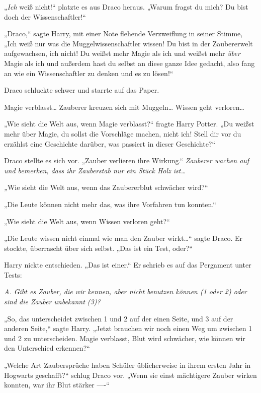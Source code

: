 {„\emph{Ich} weiß nicht!“ platzte es aus Draco heraus. „Warum fragst du mich? Du bist doch der Wissenschaftler!“

„Draco,“ sagte Harry, mit einer Note flehende Verzweiflung in seiner Stimme, „Ich weiß nur was die Muggelwissenschaftler wissen! Du bist in der Zaubererwelt aufgewachsen, ich nicht! Du weißst mehr Magie als ich und weißst mehr \emph{über} Magie als ich und außerdem hast du selbst an diese ganze Idee gedacht, also fang an wie ein Wissenschaftler zu denken und es zu lösen!“

Draco schluckte schwer und starrte auf das Paper.

Magie verblasst… Zauberer kreuzen sich mit Muggeln… Wissen geht verloren…

„Wie sieht die Welt aus, wenn Magie verblasst?“ fragte Harry Potter. „Du weißst mehr über Magie, du sollst die Vorschläge machen, nicht ich! Stell dir vor du erzählst eine Geschichte darüber, was passiert in dieser Geschichte?“

Draco stellte es sich vor. „Zauber verlieren ihre Wirkung.“ \emph{Zauberer wachen auf und bemerken, dass ihr Zauberstab nur ein Stück Holz ist…}

\emph{„}Wie sieht die Welt aus, wenn das Zaubererblut schwächer wird?“

„Die Leute können nicht mehr das, was ihre Vorfahren tun konnten.“

„Wie sieht die Welt aus, wenn Wissen verloren geht?“

„Die Leute wissen nicht einmal wie man den Zauber wirkt…“ sagte Draco. Er stockte, überrascht über sich selbst. „Das ist ein Test, oder?“

Harry nickte entschieden. „Das ist einer.“ Er schrieb es auf das Pergament unter Tests:

\emph{A. Gibt es Zauber, die wir kennen, aber nicht benutzen können (1 oder 2) oder sind die Zauber unbekannt (3)?}

„So, das unterscheidet zwischen 1 und 2 auf der einen Seite, und 3 auf der anderen Seite,“ sagte Harry. „Jetzt brauchen wir noch einen Weg um zwischen 1 und 2 zu unterscheiden. Magie verblasst, Blut wird schwächer, wie können wir den Unterschied erkennen?“

„Welche Art Zaubersprüche haben Schüler üblicherweise in ihrem ersten Jahr in Hogwarts geschafft?“ schlug Draco vor. „Wenn sie einst mächtigere Zauber wirken konnten, war ihr Blut stärker ----“

}
